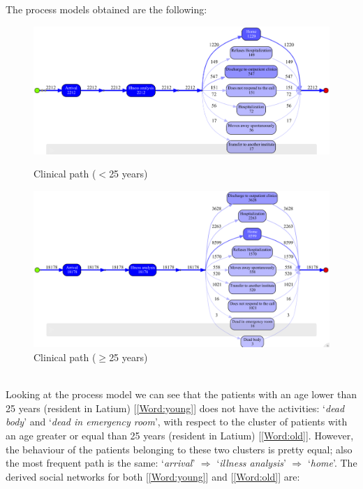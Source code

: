 \clearpage
\noindent
The process models obtained are the following:
\begin{figure} [htbp]
\includegraphics[width=\textwidth, keepaspectratio]{ProntoSoccorsoInductiveVisualMinerYoungs}
\caption{Clinical path ($<$25 years)}
\includegraphics[width=\textwidth, keepaspectratio]{ProntoSoccorsoInductiveVisualMinerOlds}
\caption{Clinical path ($\geq$25 years)}
\end{figure}\\
Looking at the process model we can see that the patients with an age lower than 25 years (resident in Latium) [\ref{Word:young}] does not have the activities: `\textit{dead body}' and `\textit{dead in emergency room}', with respect to the cluster of patients with an age greater or equal than 25 years (resident in Latium) [\ref{Word:old}]. However, the behaviour of the patients belonging to these two clusters is pretty equal; also the most frequent path is the same: `\textit{arrival}' $\Rightarrow$ `\textit{illness analysis}' $\Rightarrow$ `\textit{home}'.
\clearpage
\noindent
The derived social networks for both [\ref{Word:young}] and [\ref{Word:old}] are:


